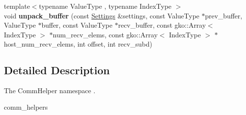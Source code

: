 \begin{DoxyCompactItemize}
\item 
\mbox{\label{namespaceschwz_1_1CommHelpers_ab7bf4105fe1bfbe1f1a81859b2d1d9cf}} 
{\footnotesize template$<$typename Value\+Type , typename Index\+Type $>$ }\\void {\bfseries unpack\+\_\+buffer} (const \hyperlink{structschwz_1_1Settings}{Settings} \&settings, const Value\+Type $\ast$prev\+\_\+buffer, Value\+Type $\ast$buffer, const Value\+Type $\ast$recv\+\_\+buffer, const gko\+::\+Array$<$ Index\+Type $>$ $\ast$num\+\_\+recv\+\_\+elems, const gko\+::\+Array$<$ Index\+Type $>$ $\ast$host\+\_\+num\+\_\+recv\+\_\+elems, int offset, int recv\+\_\+subd)
\end{DoxyCompactItemize}


\subsection{Detailed Description}
The Comm\+Helper namespace . 

comm\+\_\+helpers 
